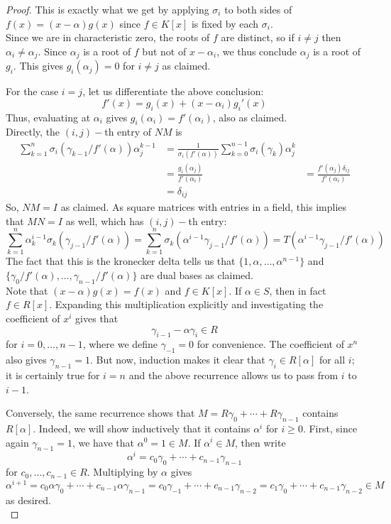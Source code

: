 \begin{proof}
	This is exactly what we get by applying $\sigma_i$ to both sides of $f(x) = (x-\alpha)g(x)$ since $f \in K[x]$ is fixed by each $\sigma_i$. \\
	
	Since we are in characteristic zero, the roots of $f$ are distinct, so if $i \neq j$ then $\alpha_i \neq \alpha_j$. Since $\alpha_j$ is a root of $f$ but not of $x-\alpha_i$, we thus conclude $\alpha_j$ is a root of $g_i$. This gives $g_i(\alpha_j) = 0$ for $i \neq j$ as claimed.
	
	For the case $i=j$, let us differentiate the above conclusion:
	\[ f'(x) = g_i(x) + (x-\alpha_i)g_i'(x) \]
	Thus, evaluating at $\alpha_i$ gives $g_i(\alpha_i) = f'(\alpha_i)$, also as claimed. \\
	
	Directly, the $(i,j)-$th entry of $NM$ is
	\begin{align*}
	\sum_{k=1}^n \sigma_i(\gamma_{k-1}/f'(\alpha))\alpha_j^{k-1}
		&= \frac{1}{\sigma_i(f'(\alpha))}\sum_{k=0}^{n-1} \sigma_i(\gamma_k)\alpha_j^k \\
		&= \frac{g_i(\alpha_j)}{f'(\alpha_i)}
		&= \frac{f'(\alpha_j)\delta_{ij}}{f'(\alpha_i)} \\
		&= \delta_{ij}
	\end{align*}
	So, $NM = I$ as claimed. As square matrices with entries in a field, this implies that $MN = I$ as well, which has $(i,j)-$th entry:
	\[ \sum_{k=1}^n \alpha_k^{i-1}\sigma_k(\gamma_{j-1}/f'(\alpha)) = \sum_{k=1}^n \sigma_k(\alpha^{i-1}\gamma_{j-1}/f'(\alpha)) = T(\alpha^{i-1}\gamma_{j-1}/f'(\alpha)) \]
	The fact that this is the kronecker delta tells us that $\{1,\alpha,\ldots,\alpha^{n-1}\}$ and $\{\gamma_0/f'(\alpha),\ldots,\gamma_{n-1}/f'(\alpha)\}$ are dual bases as claimed. \\
	
	Note that $(x-\alpha)g(x) = f(x)$ and $f \in K[x]$. If $\alpha \in S$, then in fact $f \in R[x]$. Expanding this multiplication explicitly and investigating the coefficient of $x^i$ gives that
	\[ \gamma_{i-1}-\alpha\gamma_i \in R \]
	for $i=0,\ldots,n-1$, where we define $\gamma_{-1} = 0$ for convenience. The coefficient of $x^n$ also gives $\gamma_{n-1} = 1$. But now, induction makes it clear that $\gamma_i \in R[\alpha]$ for all $i$; it is certainly true for $i=n$ and the above recurrence allows us to pass from $i$ to $i-1$.
	
	Conversely, the same recurrence shows that $M = R\gamma_0 + \cdots + R\gamma_{n-1}$ contains $R[\alpha]$. Indeed, we will show inductively that it contains $\alpha^i$ for $i \geq 0$. First, since again $\gamma_{n-1} = 1$, we have that $\alpha^0 = 1 \in M$. If $\alpha^i \in M$, then write
	\[ \alpha^i = c_0\gamma_0 + \cdots + c_{n-1}\gamma_{n-1} \]
	for $c_0,\ldots,c_{n-1} \in R$. Multiplying by $\alpha$ gives
	\[ \alpha^{i+1} = c_0\alpha\gamma_0 + \cdots + c_{n-1}\alpha\gamma_{n-1} = c_0\gamma_{-1} + \cdots + c_{n-1}\gamma_{n-2} = c_1\gamma_0 + \cdots + c_{n-1}\gamma_{n-2} \in M \]
	as desired. \\
	

\end{proof}
